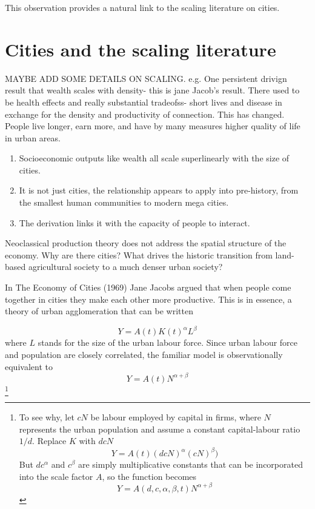 This observation provides a natural link to the scaling literature on cities.



\section{Cities and the scaling literature}

MAYBE ADD SOME DETAILS ON SCALING. e.g.
One persistent drivign result that wealth scales with density- this is jane Jacob's result. 
There used to be health effects and really substantial tradeofss- short lives and disease in exchange for the density and productivity of connection. This has changed. People live longer, earn more, and have by many measures higher quality of life in urban areas. 
\begin{enumerate}
 \item Socioeconomic outputs like wealth all scale superlinearly with the size of cities. 
\item It is not just cities, the relationship appears to apply into pre-history, from the smallest human communities to modern mega cities. %
\item The derivation links it with the capacity of people to interact.
\end{enumerate}



Neoclassical production theory does not address the spatial structure of the economy. Why are there cities? What drives the historic transition from land-based agricultural society to a much denser urban society? 

In The Economy of Cities (1969) Jane Jacobs argued that when people come together in cities they make each other more productive. This is in essence, a theory of urban agglomeration that can be written

\begin{equation}
Y = A(t) K(t)^\alpha L^\beta 
\label{eqn-production-jacobs}
\end{equation}
where $L$ stands for the size of the urban labour force. Since urban labour force and population are closely correlated, the familiar model is observationally equivalent to
\begin{equation}
Y = A(t)N^{\alpha+\beta}
\label{eqn-production-jacobs-2}
\end{equation}
\footnote{ To see why, let  $cN$ be labour employed by capital in firms, where $N$ represents the urban population and assume a constant capital-labour ratio $1/d$. Replace $K$ with $dcN$
\[Y = A(t) (dcN)^\alpha (cN)^\beta) \]
But  $dc^\alpha$ and $c^\beta$ are simply multiplicative constants that can be incorporated into the scale factor $A$, so the function becomes 
\[Y = A(d, c,\alpha, \beta, t)N^{\alpha+\beta}\]
}

